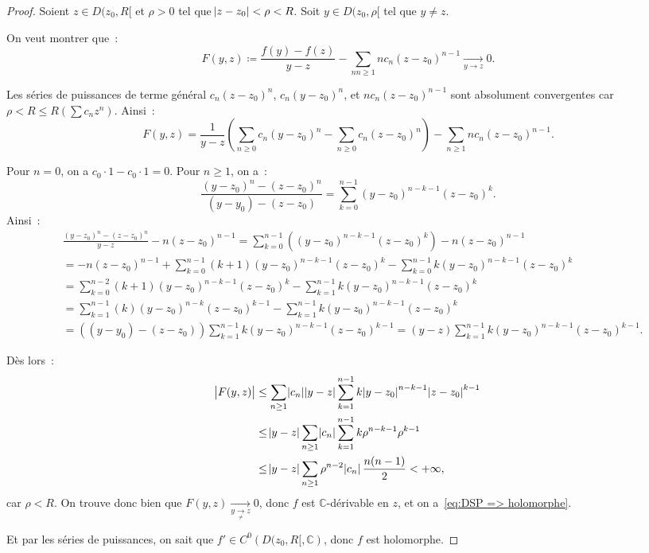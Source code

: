 \documentclass{report}
\theoremstyle{definition}
\theoremstyle{remark}
\numberwithin{equation}{section}
\newcommand{\C}{\mathbb C}
\newcommand{\pinfty}{{+\infty}}
\begin{document}
			\begin{proof} Soient $z \in D(z_0, R[$ et $\rho > 0$ tel que $\abs {z-z_0} < \rho < R$. Soit $y \in D(z_0, \rho[$ tel que $y \neq z$.

			On veut montrer que~:
			\begin{equation}
				F(y, z) \coloneqq \frac {f(y)-f(z)}{y-z} - \sum_{nn \geq 1}n c_n(z-z_0)^{n-1} \xrightarrow[y \to z]{} 0.
			\end{equation}

			Les séries de puissances de terme général $c_n(z-z_0)^n$, $c_n(y-z_0)^n$, et $nc_n(z-z_0)^{n-1}$ sont absolument convergentes car
			$\rho < R \leq R\left(\sum c_nz^n\right)$. Ainsi~:
			\begin{equation}
				F(y, z) = \frac 1{y-z}\left(\sum_{n \geq 0}c_n(y-z_0)^n - \sum_{n \geq 0}c_n(z-z_0)^n\right) - \sum_{n \geq 1}nc_n(z-z_0)^{n-1}.
			\end{equation}

			Pour $n=0$, on a $c_0 \cdot 1 - c_0 \cdot 1 = 0$. Pour $n \geq 1$, on a~:
			\begin{equation}
				\frac {(y-z_0)^n - (z-z_0)^n}{(y-y_0) - (z-z_0)} = \sum_{k=0}^{n-1}(y-z_0)^{n-k-1}(z-z_0)^k.
			\end{equation}
			Ainsi~:
			\begin{align}
				&\frac {(y-z_0)^n - (z-z_0)^n}{y-z} - n(z-z_0)^{n-1} = \sum_{k=0}^{n-1}\left((y-z_0)^{n-k-1}(z-z_0)^k\right) - n(z-z_0)^{n-1} \\
				&= -n(z-z_0)^{n-1} + \sum_{k=0}^{n-1}(k+1)(y-z_0)^{n-k-1}(z-z_0)^k - \sum_{k=0}^{n-1}k(y-z_0)^{n-k-1}(z-z_0)^k \\
				&= \sum_{k=0}^{n-2}(k+1)(y-z_0)^{n-k-1}(z-z_0)^k - \sum_{k=1}^{n-1}k(y-z_0)^{n-k-1}(z-z_0)^k \\
				&= \sum_{k=1}^{n-1}(k)(y-z_0)^{n-k}(z-z_0)^{k-1} - \sum_{k=1}^{n-1}k(y-z_0)^{n-k-1}(z-z_0)^k \\
				&= \left((y-y_0) - (z-z_0)\right)\sum_{k=1}^{n-1}k(y-z_0)^{n-k-1}(z-z_0)^{k-1} = (y-z)\sum_{k=1}^{n-1}k(y-z_0)^{n-k-1}(z-z_0)^{k-1}.
			\end{align}

			Dès lors~:
			\begin{align}
				\abs {F(y, z)} &\leq \sum_{n \geq 1}\abs {c_n}\abs {y-z}\sum_{k=1}^{n-1}k\abs {y-z_0}^{n-k-1}\abs {z-z_0}^{k-1} \\
				&\leq \abs {y-z}\sum_{n \geq 1}\abs {c_n}\sum_{k=1}^{n-1}k\rho^{n-k-1}\rho^{k-1} \\
				&\leq \abs {y-z}\sum_{n \geq 1}\rho^{n-2}\abs {c_n}\frac {n(n-1)}2 < \pinfty,
			\end{align}
			car $\rho < R$. On trouve donc bien que $F(y, z) \xrightarrow[y \underset \neq\to z]{} 0$, donc $f$ est $\C$-dérivable en $z$, et on
			a~\eqref{eq:DSP => holomorphe}.

			Et par les séries de puissances, on sait que $f' \in C^0\left(D(z_0, R[, \C\right)$, donc $f$ est holomorphe.
			\end{proof}
\end{document}

